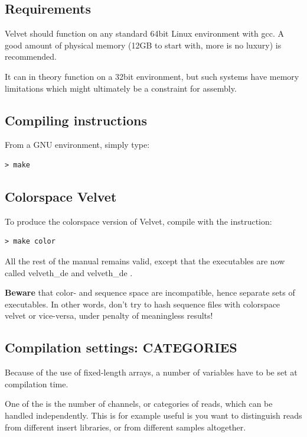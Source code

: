 \documentclass{article}
\begin{document}
\subsection{Requirements}

	Velvet should function on any standard 64bit Linux environment with
gcc. A good amount of physical memory (12GB to start with, more is no luxury)
is recommended. 
	
	It can in theory function on a 32bit environment, but such systems have memory limitations which might ultimately be a constraint for assembly.

\subsection{Compiling instructions}

\label{sec:compilation}

From a GNU environment, simply type:

\begin{verbatim}
> make
\end{verbatim}

\subsection{Colorspace Velvet}

To produce the colorspace version of Velvet, compile with the instruction:

\begin{verbatim}
> make color
\end{verbatim}

All the rest of the manual remains valid, except that the executables are now called velveth\_de and velveth\_de . 

\textbf{Beware} that color- and sequence space are incompatible, hence separate sets of executables. In other words, don't try to hash sequence files with colorspace velvet or vice-versa, under penalty of meaningless results!

\subsection{Compilation settings: CATEGORIES}

Because of the use of fixed-length arrays, a number of variables have to be set at compilation time. 

One of the is the number of channels, or categories of reads, which can be handled independently. This is for example useful is you want to distinguish reads from different insert libraries, or from different samples altogether.
\end{document}
